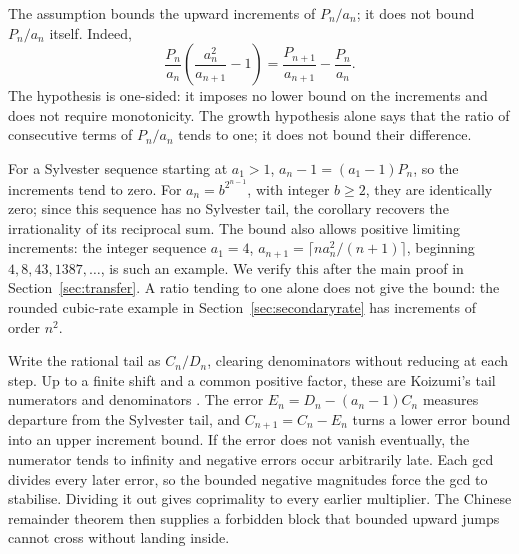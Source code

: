 \documentclass[11pt]{article}
\begin{document}
The assumption bounds the upward increments of $P_n/a_n$; it does not
bound $P_n/a_n$ itself. Indeed,
\[
 \frac{P_n}{a_n}\left(\frac{a_n^2}{a_{n+1}}-1\right)
 =\frac{P_{n+1}}{a_{n+1}}-\frac{P_n}{a_n}.
\]
The hypothesis is one-sided: it imposes no lower bound on the increments
and does not require monotonicity.
The growth hypothesis alone says that the ratio of consecutive terms of
$P_n/a_n$ tends to one; it does not bound their difference.

For a Sylvester sequence starting at $a_1>1$,
$a_n-1=(a_1-1)P_n$, so the increments tend to zero. For
$a_n=b^{2^{n-1}}$, with integer $b\ge2$, they are identically zero;
since this sequence has no Sylvester tail, the corollary recovers the
irrationality of its reciprocal sum. The bound also allows positive
limiting increments: the integer sequence
$a_1=4$, $a_{n+1}=\lceil n a_n^2/(n+1)\rceil$, beginning
$4,8,43,1387,\ldots$, is such an example. We verify this after the main
proof in Section~\ref{sec:transfer}. A ratio tending to one alone does
not give the bound: the rounded cubic-rate example in
Section~\ref{sec:secondaryrate} has increments of order $n^2$.

Write the rational tail as $C_n/D_n$, clearing denominators without
reducing at each step. Up to a finite shift and a common positive factor,
these are Koizumi's tail numerators and denominators
\cite[Corollary~3, p.~9; Lemma~4, pp.~11--12]{koizumi2025}.
The error $E_n=D_n-(a_n-1)C_n$ measures departure from the Sylvester tail,
and $C_{n+1}=C_n-E_n$ turns a lower error bound into an upper increment
bound. If the error does not vanish eventually, the numerator tends to
infinity and negative errors occur arbitrarily late. Each gcd divides
every later error, so the bounded negative magnitudes force the gcd to
stabilise. Dividing it out gives coprimality to every earlier multiplier.
The Chinese remainder theorem then supplies a forbidden block that
bounded upward jumps cannot cross without landing inside.
\end{document}
